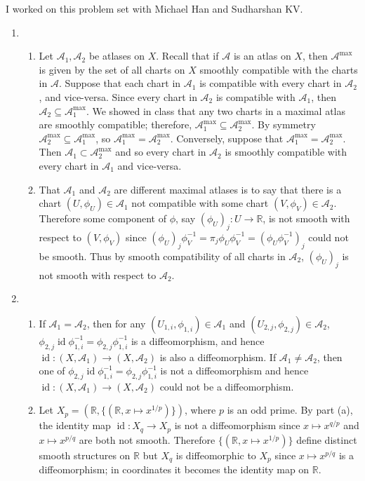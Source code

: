 \documentclass[11pt,leqno]{article}
\theoremstyle{plain}
\theoremstyle{definition}
\numberwithin{equation}{section}
\numberwithin{lem}{section}
\DeclareMathOperator{\id}{id}
\begin{document}
I worked on this problem set with Michael Han and Sudharshan KV.
\begin{enumerate}
    \item \begin{enumerate}
        \item Let $\mathcal A_1,\mathcal A_2$ be atlases on $X$. Recall that if $\mathcal A$ is an atlas on $X$, then $\mathcal A^{\max}$ is given by the set of all charts on $X$ smoothly compatible with the charts in $\mathcal A$. Suppose that each chart in $\mathcal A_1$ is compatible with every chart in $\mathcal A_2$, and vice-versa. Since every chart in $\mathcal A_2$ is compatible with $\mathcal A_1$, then $\mathcal A_2 \subseteq \mathcal A_1^{\max}$. We showed in class that any two charts in a maximal atlas are smoothly compatible; therefore, $\mathcal A_1^{\max} \subseteq \mathcal A_2^{\max}$. By symmetry $\mathcal A_2^{\max} \subseteq \mathcal A_1^{\max}$, so $\mathcal A_1^{\max} = \mathcal A_2^{\max}$. Conversely, suppose that $\mathcal A_1^{\max} = \mathcal A_2^{\max}$. Then $\mathcal A_1\subset \mathcal A_2^{\max}$ and so every chart in $\mathcal A_2$ is smoothly compatible with every chart in $\mathcal A_1$ and vice-versa.
        \item That $\mathcal A_1$ and $\mathcal A_2$ are different maximal atlases is to say that there is a chart $(U,\phi_U)\in \mathcal A_1$ not compatible with some chart $(V,\phi_V)\in\mathcal A_2$. Therefore some component of $\phi$, say $(\phi_U)_j\colon U\to\mathbb R$, is not smooth with respect to $(V,\phi_V)$ since $(\phi_U)_j\phi_V^{-1} = \pi_j\phi_U\phi_V^{-1} = (\phi_U\phi_V^{-1})_j$ could not be smooth. Thus by smooth compatibility of all charts in $\mathcal A_2$, $(\phi_U)_j$ is not smooth with respect to $\mathcal A_2$.
    \end{enumerate}
    \item \begin{enumerate}
      \item If $\mathcal A_1=\mathcal A_2$, then for any $(U_{1,i},\phi_{1,i})\in\mathcal A_1$ and $(U_{2,j},\phi_{2,j})\in\mathcal A_2$, $\phi_{2,j}\id\phi_{1,i}^{-1} = \phi_{2,j}\phi_{1,i}^{-1}$ is a diffeomorphism, and hence $\id\colon (X,\mathcal A_1)\to (X,\mathcal A_2)$ is also a diffeomorphism. If $\mathcal A_1\neq \mathcal A_2$, then one of $\phi_{2,j}\id\phi_{1,i}^{-1} = \phi_{2,j}\phi_{1,i}^{-1}$ is not a diffeomorphism and hence $\id\colon (X,\mathcal A_1)\to (X,\mathcal A_2)$ could not be a diffeomorphism.
      \item Let $X_{p} = (\mathbb R,\{(\mathbb R, x\mapsto x^{1/p})\})$, where $p$ is an odd prime. By part (a), the identity map $\id\colon X_q\to X_p$ is not a diffeomorphism since $x\mapsto x^{q/p}$ and $x\mapsto x^{p/q}$ are both not smooth. Therefore $\{(\mathbb R, x\mapsto x^{1/p})\}$ define distinct smooth structures on $\mathbb R$ but $X_q$ is diffeomorphic to $X_p$ since $x\mapsto x^{p/q}$ is a diffeomorphism; in coordinates it becomes the identity map on $\mathbb R$.

\end{enumerate}
\end{enumerate}
\end{document}
